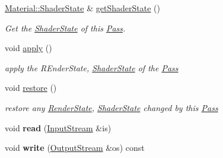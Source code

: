 \begin{DoxyCompactItemize}
\hyperlink{class_i_dream_sky_1_1_material_1_1_shader_state}{Material\+::\+Shader\+State} \& \hyperlink{class_i_dream_sky_1_1_material_1_1_pass_a264601abd6e2243c0e734d67ed95b8c6}{get\+Shader\+State} ()
\begin{DoxyCompactList}\small\item\em Get the \hyperlink{class_i_dream_sky_1_1_material_1_1_shader_state}{Shader\+State} of this \hyperlink{class_i_dream_sky_1_1_material_1_1_pass}{Pass}. \end{DoxyCompactList}\item 
void \hyperlink{class_i_dream_sky_1_1_material_1_1_pass_a0a060b8be5270104743fdb8efe5fa348}{apply} ()\hypertarget{class_i_dream_sky_1_1_material_1_1_pass_a0a060b8be5270104743fdb8efe5fa348}{}\label{class_i_dream_sky_1_1_material_1_1_pass_a0a060b8be5270104743fdb8efe5fa348}

\begin{DoxyCompactList}\small\item\em apply the R\+Ender\+State, \hyperlink{class_i_dream_sky_1_1_material_1_1_shader_state}{Shader\+State} of the \hyperlink{class_i_dream_sky_1_1_material_1_1_pass}{Pass} \end{DoxyCompactList}\item 
void \hyperlink{class_i_dream_sky_1_1_material_1_1_pass_afb19c57c57e99824bee63fded7c4cb50}{restore} ()\hypertarget{class_i_dream_sky_1_1_material_1_1_pass_afb19c57c57e99824bee63fded7c4cb50}{}\label{class_i_dream_sky_1_1_material_1_1_pass_afb19c57c57e99824bee63fded7c4cb50}

\begin{DoxyCompactList}\small\item\em restore any \hyperlink{class_i_dream_sky_1_1_material_1_1_render_state}{Render\+State}, \hyperlink{class_i_dream_sky_1_1_material_1_1_shader_state}{Shader\+State} changed by this \hyperlink{class_i_dream_sky_1_1_material_1_1_pass}{Pass} \end{DoxyCompactList}\item 
void {\bfseries read} (\hyperlink{class_i_dream_sky_1_1_input_stream}{Input\+Stream} \&is)\hypertarget{class_i_dream_sky_1_1_material_1_1_pass_a5630ce4c5ed58e481429dcd49a73309b}{}\label{class_i_dream_sky_1_1_material_1_1_pass_a5630ce4c5ed58e481429dcd49a73309b}

\item 
void {\bfseries write} (\hyperlink{class_i_dream_sky_1_1_output_stream}{Output\+Stream} \&os) const \hypertarget{class_i_dream_sky_1_1_material_1_1_pass_a828c2f82220231c8b1a5aa7140a1e3bc}{}\label{class_i_dream_sky_1_1_material_1_1_pass_a828c2f82220231c8b1a5aa7140a1e3bc}

\end{DoxyCompactItemize}
